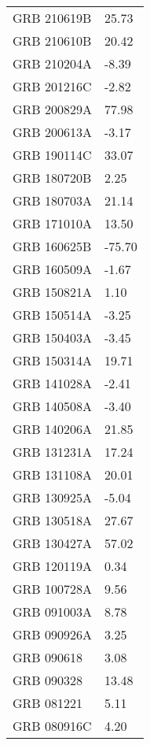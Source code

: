 \begin{tabular}{ll}
\toprule
\midrule
GRB 210619B & 25.73 \\
GRB 210610B & 20.42 \\
GRB 210204A & -8.39 \\
GRB 201216C & -2.82 \\
GRB 200829A & 77.98 \\
GRB 200613A & -3.17 \\
GRB 190114C & 33.07 \\
GRB 180720B & 2.25 \\
GRB 180703A & 21.14 \\
GRB 171010A & 13.50 \\
GRB 160625B & -75.70 \\
GRB 160509A & -1.67 \\
GRB 150821A & 1.10 \\
GRB 150514A & -3.25 \\
GRB 150403A & -3.45 \\
GRB 150314A & 19.71 \\
GRB 141028A & -2.41 \\
GRB 140508A & -3.40 \\
GRB 140206A & 21.85 \\
GRB 131231A & 17.24 \\
GRB 131108A & 20.01 \\
GRB 130925A & -5.04 \\
GRB 130518A & 27.67 \\
GRB 130427A & 57.02 \\
GRB 120119A & 0.34 \\
GRB 100728A & 9.56 \\
GRB 091003A & 8.78 \\
GRB 090926A & 3.25 \\
GRB 090618 & 3.08 \\
GRB 090328 & 13.48 \\
GRB 081221 & 5.11 \\
GRB 080916C & 4.20 \\
\bottomrule
\end{tabular}
